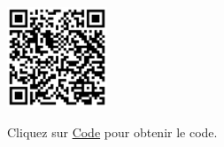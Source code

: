 \documentclass[a4paper,12pt]{report}
\begin{document}
\begin{minipage}{0.5\textwidth}
    \includegraphics[height=3cm]{Code TC300.png}
\end{minipage}%
\begin{minipage}{0.5\textwidth}
    Cliquez sur \href{https://github.com/DexterTaha/Controllino-PLC-Sample/blob/main/TC300/TC300_Parking/TC300_Parking.ino}{Code} pour obtenir le code.
\end{minipage}

\newpage
\end{document}
